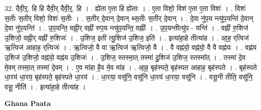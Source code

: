\documentclass[17pt]{extarticle}
\begin{document}
32. दैवी॒र्॒. हि हि दैवी॒र् दैवी॒र्॒. हि । . ह्ये॑ता ए॒ता हि ह्ये॑ताः । . ए॒ता विशो॒ विश॑ ए॒ता ए॒ता विशः॑ । . विशः॑ स॒तीः स॒तीर् विशो॒ विशः॑ स॒तीः । . स॒तीर् दे॒वान् दे॒वान् थ्स॒तीः स॒तीर् दे॒वान् । . दे॒वा नु॑प॒य न्त्यु॑प॒यन्ति॑ दे॒वान् दे॒वा नु॑प॒यन्ति॑ । . उ॒प॒यन्ति॒ वह्नी॒र् वह्नी॑ रुप॒य न्त्यु॑प॒यन्ति॒ वह्नीः᳚ । . उ॒प॒यन्तीत्यु॑प - यन्ति॑ । . वह्नी॑ रु॒शिज॑ उ॒शिजो॒ वह्नी॒र् वह्नी॑ रु॒शिजः॑ । . उ॒शिज॒ इती त्यु॒शिज॑ उ॒शिज॒ इति॑ । . इत्या॑हा॒हे तीत्या॑ह । . आ॒ह॒ र्‌त्विज॑ ऋ॒त्विज॑ आहाह॒ र्‌त्विजः॑ । . ऋ॒त्विजो॒ वै वा ऋ॒त्विज॑ ऋ॒त्विजो॒ वै । . वै वह्न॑यो॒ वह्न॑यो॒ वै वै वह्न॑यः । . वह्न॑य उ॒शिज॑ उ॒शिजो॒ वह्न॑यो॒ वह्न॑य उ॒शिजः॑ । . उ॒शिज॒ स्तस्मा॒त् तस्मा॑ दु॒शिज॑ उ॒शिज॒ स्तस्मा᳚त् । . तस्मा॑ दे॒व मे॒वम् तस्मा॒त् तस्मा॑ दे॒वम् । . ए॒व मा॑हा है॒व मे॒व मा॑ह । . आ॒ह॒ बृह॑स्पते॒ बृह॑स्पत आहाह॒ बृह॑स्पते । . बृह॑स्पते धा॒रय॑ धा॒रय॒ बृह॑स्पते॒ बृह॑स्पते धा॒रय॑ । . धा॒रया॒ वसू॑नि॒ वसू॑नि धा॒रय॑ धा॒रया॒ वसू॑नि । . वसू॒नी तीति॒ वसू॑नि॒ वसू॒ नीति॑ । . इत्या॑हा॒हे तीत्या॑ह । \newline

\textbf{Ghana Paata } \newline
\end{document}
